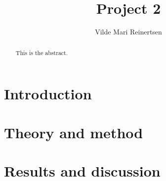 \documentclass[a4paper,12pt]{article}
\date{}
\author{Vilde Mari Reinertsen}
\title{Project 2}
\begin{document}
\begingroup
\let\center\flushleft
\let\endcenter\endflushleft
\maketitle
\endgroup

\begin{abstract}
This is the abstract.
\end{abstract}

\tableofcontents

\section{Introduction}


\section{Theory and method}


\section{Results and discussion}


\begin{appendices}

\end{appendices}


\newpage

\end{document}
